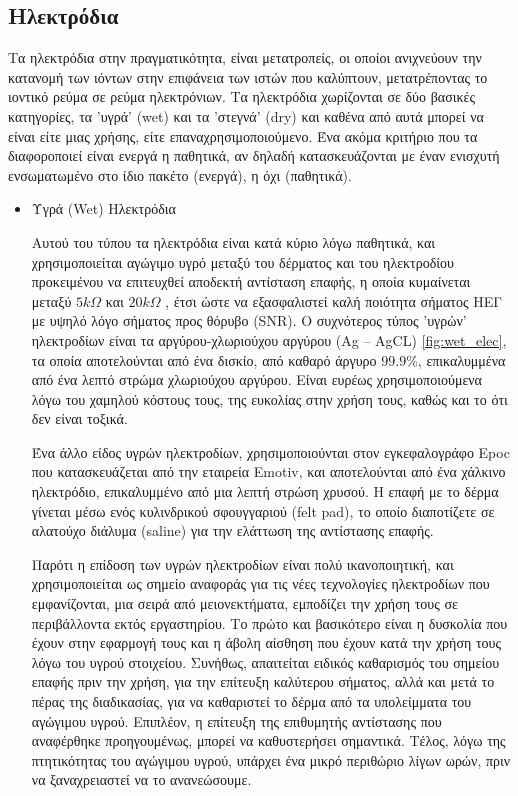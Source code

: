\documentclass[11pt,a4paper,english,greek,twoside]{../Thesis}
\begin{document}
\subsection{Ηλεκτρόδια}
  \par Tα ηλεκτρόδια στην πραγματικότητα, είναι μετατροπείς, οι οποίοι ανιχνεύουν την κατανομή των ιόντων στην επιφάνεια των ιστών που καλύπτουν, μετατρέποντας το ιοντικό ρεύμα σε ρεύμα ηλεκτρόνιων. Τα ηλεκτρόδια χωρίζονται σε δύο βασικές κατηγορίες, τα 'υγρά' (wet) και τα 'στεγνά' (dry) και καθένα από αυτά μπορεί να είναι είτε μιας χρήσης, είτε επαναχρησιμοποιούμενο. Ένα ακόμα κριτήριο που τα διαφοροποιεί είναι ενεργά η παθητικά, αν δηλαδή κατασκευάζονται με έναν ενισχυτή ενσωματωμένο στο ίδιο πακέτο (ενεργά), η όχι (παθητικά).
\begin{itemize}
    \item{Υγρά (Wet) Ηλεκτρόδια}
    \label{subsec:wet_elec}
    \par Αυτού του τύπου τα ηλεκτρόδια είναι κατά κύριο λόγω παθητικά, και χρησιμοποιείται αγώγιμο υγρό μεταξύ του δέρματος και του ηλεκτροδίου προκειμένου να επιτευχθεί αποδεκτή αντίσταση επαφής, η οποία κυμαίνεται μεταξύ $5kΩ$ και $20kΩ$ \cite{Nunez2006-li}, έτσι ώστε να εξασφαλιστεί καλή ποιότητα σήματος ΗΕΓ με υψηλό λόγο σήματος προς θόρυβο (SNR). Ο συχνότερος τύπος 'υγρών' ηλεκτροδίων είναι τα αργύρου-χλωριούχου αργύρου (Ag – AgCL) \ref{fig:wet_elec}, τα οποία αποτελούνται από ένα δισκίο, από καθαρό άργυρο $99.9\% $, επικαλυμμένα από ένα λεπτό στρώμα χλωριούχου αργύρου. Είναι ευρέως χρησιμοποιούμενα λόγω του χαμηλού κόστους τους, της ευκολίας στην χρήση τους, καθώς και το ότι δεν είναι τοξικά.  
    \par Ένα άλλο είδος υγρών ηλεκτροδίων, χρησιμοποιούνται στον εγκεφαλογράφο Epoc που κατασκευάζεται από την εταιρεία Emotiv, και αποτελούνται από ένα χάλκινο ηλεκτρόδιο, επικαλυμμένο από μια λεπτή στρώση χρυσού. Η επαφή με το δέρμα γίνεται μέσω ενός κυλινδρικού σφουγγαριού (felt pad), το οποίο διαποτίζετε σε αλατούχο διάλυμα (saline) για την ελάττωση της αντίστασης επαφής.
    \par Παρότι η επίδοση των υγρών ηλεκτροδίων είναι πολύ ικανοποιητική, και χρησιμοποιείται ως σημείο αναφοράς για τις νέες τεχνολογίες ηλεκτροδίων που εμφανίζονται, μια σειρά από μειονεκτήματα, εμποδίζει την χρήση τους σε περιβάλλοντα εκτός εργαστηρίου. Το πρώτο και βασικότερο είναι η δυσκολία που έχουν στην εφαρμογή τους και η άβολη αίσθηση που έχουν κατά την χρήση τους λόγω του υγρού στοιχείου. Συνήθως, απαιτείται ειδικός καθαρισμός  του σημείου επαφής πριν την χρήση, για την επίτευξη καλύτερου σήματος, αλλά και μετά το πέρας της διαδικασίας, για να καθαριστεί το δέρμα από  τα υπολείμματα του αγώγιμου υγρού. Επιπλέον, η επίτευξη της επιθυμητής αντίστασης που αναφέρθηκε προηγουμένως, μπορεί να καθυστερήσει σημαντικά. Τέλος, λόγω της πτητικότητας του αγώγιμου υγρού, υπάρχει ένα μικρό περιθώριο λίγων ωρών, πριν να ξαναχρειαστεί να το ανανεώσουμε.
    

\end{itemize}
\end{document}
